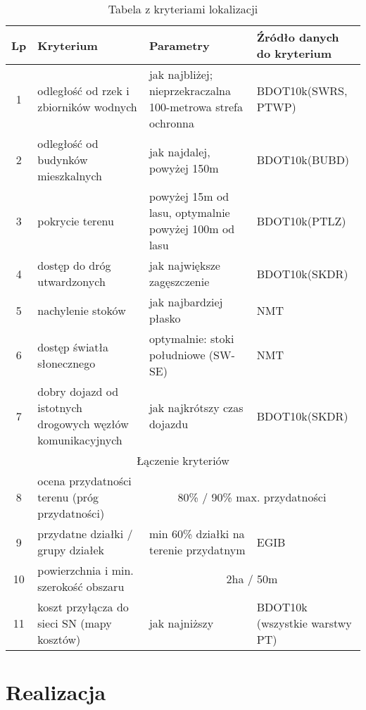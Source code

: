 \documentclass{article}
\begin{document}
\begin{table}[h!]
    \centering
    \renewcommand{\arraystretch}{1.4}
    \begin{tabular}{|c|p{4cm}|p{5cm}|p{3.5cm}|}
    \hline
    \textbf{Lp} & \textbf{Kryterium} & \textbf{Parametry} & \textbf{Źródło danych do kryterium} \\ \hline
    1 & odległość od rzek i zbiorników wodnych & jak najbliżej; nieprzekraczalna 100-metrowa strefa ochronna & BDOT10k(SWRS, PTWP)\\ \hline
    2 & odległość od budynków mieszkalnych & jak najdalej, powyżej 150m & BDOT10k(BUBD)\\ \hline
    3 & pokrycie terenu & powyżej 15m od lasu, optymalnie powyżej 100m od lasu & BDOT10k(PTLZ)\\ \hline
    4 & dostęp do dróg utwardzonych & jak największe zagęszczenie & BDOT10k(SKDR)\\ \hline
    5 & nachylenie stoków & jak najbardziej płasko & NMT\\ \hline
    6 & dostęp światła słonecznego & optymalnie: stoki południowe (SW-SE) & NMT\\ \hline
    7 & dobry dojazd od istotnych drogowych węzłów komunikacyjnych & jak najkrótszy czas dojazdu & BDOT10k(SKDR)\\ \hline
    \multicolumn{4}{|c|}{Łączenie kryteriów} \\ \hline
    8 & ocena przydatności terenu (próg przydatności) & \multicolumn{2}{|c|}{80\% / 90\% max. przydatności}\\ \hline
    9 & przydatne działki / grupy działek & min 60\% działki na terenie przydatnym & EGIB \\ \hline
    10 & powierzchnia i min. szerokość obszaru & \multicolumn{2}{|c|}{2ha / 50m}\\ \hline
    11 & koszt przyłącza do sieci SN (mapy kosztów) & jak najniższy & BDOT10k (wszystkie warstwy PT)\\ \hline
    \end{tabular}
    \caption{Tabela z kryteriami lokalizacji}
    \label{tab:kryteria}
    \end{table}


\section{Realizacja}
\end{document}
